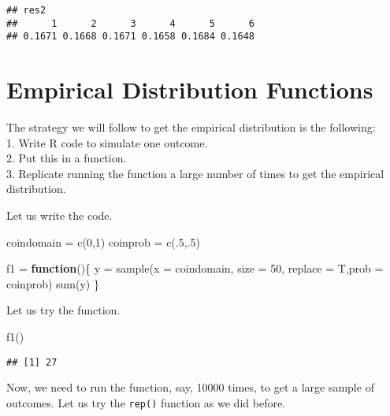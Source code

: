 \documentclass[
]{article}
\newenvironment{Shaded}{\begin{snugshade}}{\end{snugshade}}
\newcommand{\AttributeTok}[1]{\textcolor[rgb]{0.77,0.63,0.00}{#1}}
\newcommand{\ControlFlowTok}[1]{\textcolor[rgb]{0.13,0.29,0.53}{\textbf{#1}}}
\newcommand{\DecValTok}[1]{\textcolor[rgb]{0.00,0.00,0.81}{#1}}
\newcommand{\FunctionTok}[1]{\textcolor[rgb]{0.00,0.00,0.00}{#1}}
\newcommand{\NormalTok}[1]{#1}
\newcommand{\OtherTok}[1]{\textcolor[rgb]{0.56,0.35,0.01}{#1}}
\begin{document}
\begin{verbatim}
## res2
##      1      2      3      4      5      6 
## 0.1671 0.1668 0.1671 0.1658 0.1684 0.1648
\end{verbatim}

\hypertarget{empirical-distribution-functions}{%
\section{Empirical Distribution
Functions}\label{empirical-distribution-functions}}

The strategy we will follow to get the empirical distribution is the
following:\\
1. Write R code to simulate one outcome.\\
2. Put this in a function.\\
3. Replicate running the function a large number of times to get the
empirical distribution.

Let us write the code.

\begin{Shaded}
\begin{Highlighting}[]
\NormalTok{coindomain }\OtherTok{=} \FunctionTok{c}\NormalTok{(}\DecValTok{0}\NormalTok{,}\DecValTok{1}\NormalTok{)}
\NormalTok{coinprob }\OtherTok{=} \FunctionTok{c}\NormalTok{(.}\DecValTok{5}\NormalTok{,.}\DecValTok{5}\NormalTok{)}

\NormalTok{f1 }\OtherTok{=} \ControlFlowTok{function}\NormalTok{()\{}
\NormalTok{  y }\OtherTok{=} \FunctionTok{sample}\NormalTok{(}\AttributeTok{x =}\NormalTok{ coindomain, }\AttributeTok{size =} \DecValTok{50}\NormalTok{, }\AttributeTok{replace =}\NormalTok{ T,}\AttributeTok{prob =}\NormalTok{ coinprob)}
\FunctionTok{sum}\NormalTok{(y)}
\NormalTok{\}}
\end{Highlighting}
\end{Shaded}

Let us try the function.

\begin{Shaded}
\begin{Highlighting}[]
\FunctionTok{f1}\NormalTok{()}
\end{Highlighting}
\end{Shaded}

\begin{verbatim}
## [1] 27
\end{verbatim}

Now, we need to run the function, say, 10000 times, to get a large
sample of outcomes. Let us try the \texttt{rep()} function as we did
before.
\end{document}
